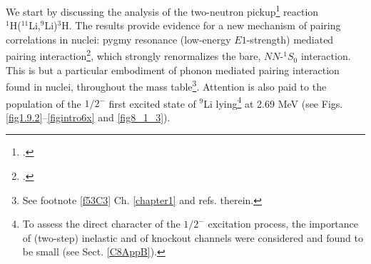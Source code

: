  We start by discussing  the analysis of the two-neutron pickup\footnote{\cite{Tanihata:08}.} reaction\\ $^1$H($^{11}$Li,$^9$Li)$^3$H. The results  provide evidence for a new mechanism of pairing correlations in nuclei: pygmy resonance (low-energy $E1$-strength) mediated pairing interaction\footnote{\citet{Barranco:01,Potel:10}.}, which strongly renormalizes the bare, $NN$-$^1S_0$ interaction. This is but a particular embodiment of phonon mediated pairing interaction found  in nuclei, throughout the mass table\footnote{See footnote \ref{f53C3} Ch. \ref{chapter1} and refs. therein.}. Attention is also paid to the  population of the $1/2^-$ first excited state of $^9$Li lying\footnote{To assess the direct character of the $1/2^-$ excitation process, the importance of (two-step) inelastic  and of knockout  channels were considered and found to be small (see Sect. \ref{C8AppB}).} at 2.69 MeV (see Figs. \ref{fig1.9.2}--\ref{figintro6x} and  \ref{fig8_1_3}). 
 

